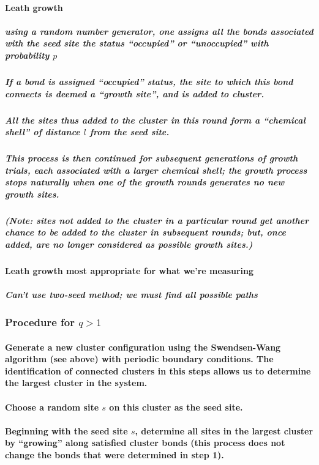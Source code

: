 \documentclass[pre,preprint]{revtex4-1}
\begin{document}
\paragraph{Leath growth \cite{Leath}}
\label{sec-1.2.2.2}
\subparagraph{using a random number generator, one assigns all the bonds associated with the seed site the status ``occupied'' or ``unoccupied'' with probability $p$}
\label{sec-1.2.2.2.1}
\subparagraph{If a bond is assigned ``occupied'' status, the site to which this bond connects is deemed a ``growth site'', and is added to cluster.}
\label{sec-1.2.2.2.2}
\subparagraph{All the sites thus added to the cluster in this round form a ``chemical shell'' of distance $l$ from the seed site.}
\label{sec-1.2.2.2.3}
\subparagraph{This process is then continued for subsequent generations of growth trials, each associated with a larger chemical shell; the growth process stops naturally when one of the growth rounds generates no new growth sites.}
\label{sec-1.2.2.2.4}
\subparagraph{(Note: sites not added to the cluster in a particular round get another chance to be added to the cluster in subsequent rounds; but, once added, are no longer considered as possible growth sites.)}
\label{sec-1.2.2.2.5}
\paragraph{Leath growth most appropriate for what we're measuring}
\label{sec-1.2.2.3}
\subparagraph{Can't use two-seed method; we must find all possible paths}
\label{sec-1.2.2.3.1}
\subsubsection{Procedure for $q>1$}
\label{sec-1.2.3}
\paragraph{Generate a new cluster configuration using the Swendsen-Wang algorithm (see above) with periodic boundary conditions. The identification of connected clusters in this steps allows us to determine the largest cluster in the system.}
\label{sec-1.2.3.1}
\paragraph{Choose a random site $s$ on this cluster as the seed site.}
\label{sec-1.2.3.2}
\paragraph{Beginning with the seed site $s$, determine all sites in the largest cluster by ``growing'' along satisfied cluster bonds (this process does not change the bonds that were determined in step 1).}
\label{sec-1.2.3.3}
\end{document}
